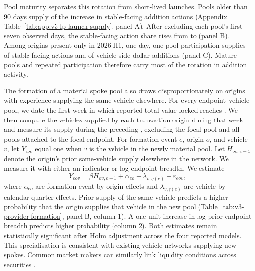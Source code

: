 Pool maturity separates this rotation from short-lived launches. Pools older than 90 days supply \VThreeLPMaturePoolIncreaseShare{} of the increase in stable-facing addition actions (Appendix Table~\ref{tab:app:v3-lp-launch-supply}, panel A). After excluding each pool's first seven observed days, the stable-facing action share rises from \VThreeLPExLaunchStableShareBaseline{} to \VThreeLPExLaunchStableShareComparison{} (panel B). Among origins present only in 2026 H1, one-day, one-pool participation supplies \VThreeLPOneDayOnePoolActionShare{} of stable-facing actions and \VThreeLPOneDayOnePoolFlowShare{} of vehicle-side dollar additions (panel C). Mature pools and repeated participation therefore carry most of the rotation in addition activity.

The formation of a material spoke pool also draws disproportionately on origins with experience supplying the same vehicle elsewhere. For every endpoint--vehicle pool, we date the first week in which reported total value locked reaches \VThreeLPFormationTVLThreshold{}. We then compare the vehicles supplied by each transaction origin during that week and measure its supply during the preceding \VThreeLPFormationLookback{}, excluding the focal pool and all pools attached to the focal endpoint. For formation event $e$, origin $o$, and vehicle $v$, let $Y_{eov}$ equal one when $v$ is the vehicle in the newly material pool. Let $H_{ov,e-1}$ denote the origin's prior same-vehicle supply elsewhere in the network. We measure it with either an indicator or log endpoint breadth. We estimate
\begin{equation}
Y_{eov}=\beta H_{ov,e-1}+\alpha_{eo}+\lambda_{v,q(e)}+\varepsilon_{eov},
\label{eq:provider-specialization}
\end{equation}
where $\alpha_{eo}$ are formation-event-by-origin effects and $\lambda_{v,q(e)}$ are vehicle-by-calendar-quarter effects. Prior supply of the same vehicle predicts a \VThreeLPSameVehicleSupplyEffect{} higher probability that the origin supplies that vehicle in the new pool (Table~\ref{tab:v3-provider-formation}, panel B, column 1). A one-unit increase in log prior endpoint breadth predicts \VThreeLPSameVehicleBreadthEffect{} higher probability (column 2). Both estimates remain statistically significant after Holm adjustment across the four reported models. This specialisation is consistent with existing vehicle networks supplying new spokes. Common market makers can similarly link liquidity conditions across securities \citep{CoughenourSaad2004CommonMarketMakers}.

